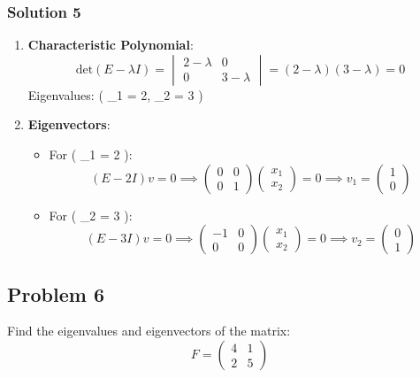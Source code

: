 \documentclass[
  letterpaper,
  DIV=11,
  numbers=noendperiod]{scrartcl}
\providecommand{\tightlist}{%
  \setlength{\itemsep}{0pt}\setlength{\parskip}{0pt}}\usepackage{longtable,booktabs,array}
\begin{document}
\subsubsection{Solution 5}\label{solution-5}

\begin{enumerate}
\def\labelenumi{\arabic{enumi}.}
\item
  \textbf{Characteristic Polynomial}: \[
  \text{det}(E - \lambda I) = \begin{vmatrix} 2 - \lambda & 0 \\ 0 & 3 - \lambda \end{vmatrix} = (2 - \lambda)(3 - \lambda) = 0
  \] Eigenvalues: ( \lambda\_1 = 2, \lambda\_2 = 3 )
\item
  \textbf{Eigenvectors}:

  \begin{itemize}
  \tightlist
  \item
    For ( \lambda\_1 = 2 ): \[
    (E - 2I)v = 0 \implies \begin{pmatrix} 0 & 0 \\ 0 & 1 \end{pmatrix}\begin{pmatrix} x_1 \\ x_2 \end{pmatrix} = 0 \implies v_1 = \begin{pmatrix} 1 \\ 0 \end{pmatrix}
    \]
  \item
    For ( \lambda\_2 = 3 ): \[
    (E - 3I)v = 0 \implies \begin{pmatrix} -1 & 0 \\ 0 & 0 \end{pmatrix}\begin{pmatrix} x_1 \\ x_2 \end{pmatrix} = 0 \implies v_2 = \begin{pmatrix} 0 \\ 1 \end{pmatrix}
    \]
  \end{itemize}
\end{enumerate}

\subsection{Problem 6}\label{problem-6}

Find the eigenvalues and eigenvectors of the matrix: \[
F = \begin{pmatrix} 4 & 1 \\ 2 & 5 \end{pmatrix}
\]
\end{document}
